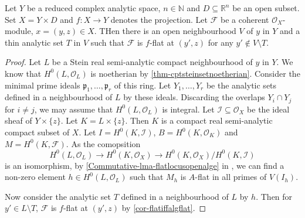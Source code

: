 \begin{lemma}\label{lma-standardgenflag}
    Let $Y$ be a reduced complex analytic space, $n\in \mathbb{N}$ and $D\subseteq \mathbb{R}^n$ be an open subset. Set $X=Y\times D$ and $f:X\rightarrow Y$ denotes the projection. Let $\mathcal{F}$ be a coherent $\mathcal{O}_X$-module, $x=(y,z)\in X$. THen there is an open neighbourhood $V$ of $y$ in $Y$ and a thin analytic set $T$ in $V$ such that $\mathcal{F}$ is $f$-flat at $(y',z)$ for any $y'\not\in V\setminus T$. 
\end{lemma}
\begin{proof}
    Let $L$ be a Stein real semi-analytic compact neighbourhood of $y$ in $Y$. 
    We know that $H^0(L,\mathcal{O}_L)$ is noetherian by \cref{thm-cptsteinsetnoetherian}. Consider the minimal prime ideals $\mathfrak{p}_1,\ldots,\mathfrak{p}_r$ of this ring. Let $Y_1,\ldots,Y_r$ be the analytic sets defined in a neighbourhood of $L$ by these ideals. Discarding the overlaps $Y_i\cap Y_j$ for $i\neq j$, we may assume that $H^0(L,\mathcal{O}_L)$ is integral. Let $\mathcal{I}\subseteq \mathcal{O}_X$ be the ideal sheaf of $Y\times \{z\}$. Let $K=L\times\{z\}$. Then $K$ is a compact real semi-analytic compact subset of $X$. Let $I=H^0(K,\mathcal{I})$, $B=H^0(K,\mathcal{O}_K)$ and $M=H^0(K,\mathcal{F})$. As the comopsition 
    \[
        H^0(L,\mathcal{O}_L)\rightarrow H^0(K,\mathcal{O}_X)  \rightarrow H^0(K,\mathcal{O}_X)/H^0(K,\mathcal{I})
    \]
    is an isomorphism, by \cref{Commutative-lma-flatlocusopenalge} in , we can find a non-zero element $h\in H^0(L,\mathcal{O}_L)$ such that $M_{h}$ is $A$-flat in all primes of $V(I_h)$.

    Now consider the analytic set $T$ defined in a neighbourhood of $L$ by $h$. Then for $y'\in L\setminus T$, $\mathcal{F}$ is $f$-flat at $(y',z)$ by \cref{cor-flatiffalgflat}. 
\end{proof}

